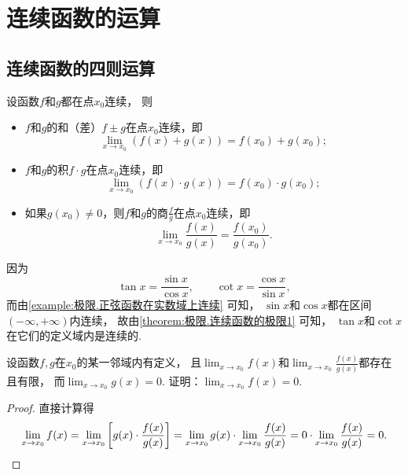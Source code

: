 \section{连续函数的运算}
\subsection{连续函数的四则运算}
\begin{theorem}\label{theorem:极限.连续函数的极限1}
设函数\(f\)和\(g\)都在点\(x_0\)连续，
则\begin{itemize}
	\item \(f\)和\(g\)的和（差）\(f \pm g\)在点\(x_0\)连续，即\[
		\lim_{x \to x_0} (f(x) + g(x))
		= f(x_0) + g(x_0);
	\]
	\item \(f\)和\(g\)的积\(f \cdot g\)在点\(x_0\)连续，即\[
		\lim_{x \to x_0} (f(x) \cdot g(x))
		= f(x_0) \cdot g(x_0);
	\]
	\item 如果\(g(x_0)\neq0\)，则\(f\)和\(g\)的商\(\frac{f}{g}\)在点\(x_0\)连续，即\[
		\lim_{x \to x_0} \frac{f(x)}{g(x)}
		= \frac{f(x_0)}{g(x_0)}.
	\]
\end{itemize}
\end{theorem}

\begin{example}
因为\[
	\tan x=\frac{\sin x}{\cos x}, \qquad
	\cot x=\frac{\cos x}{\sin x},
\]
而由\cref{example:极限.正弦函数在实数域上连续} 可知，
\(\sin x\)和\(\cos x\)都在区间\((-\infty,+\infty)\)内连续，
故由\cref{theorem:极限.连续函数的极限1} 可知，
\(\tan x\)和\(\cot x\)在它们的定义域内是连续的.
\end{example}

\begin{example}
设函数\(f,g\)在\(x_0\)的某一邻域内有定义，
且\(\lim_{x\to x_0}f(x)\)和\(\lim_{x\to x_0}\frac{f(x)}{g(x)}\)都存在且有限，
而\(\lim_{x\to x_0}g(x)=0\).
证明：\(\lim_{x\to x_0}f(x)=0\).
\begin{proof}
直接计算得\[
	\lim_{x\to x_0}f(x)
	= \lim_{x\to x_0}\left[
		g(x) \cdot \frac{f(x)}{g(x)}
	\right]
	= \lim_{x\to x_0}g(x) \cdot \lim_{x\to x_0}\frac{f(x)}{g(x)}
	= 0 \cdot \lim_{x\to x_0}\frac{f(x)}{g(x)} = 0.
	\qedhere
\]
\end{proof}
\end{example}

